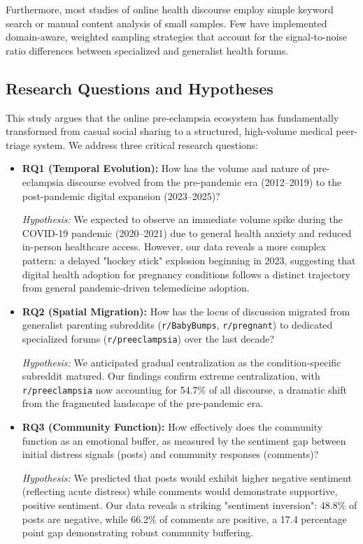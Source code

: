 \documentclass[12pt, a4paper]{article}
\begin{document}
Furthermore, most studies of online health discourse employ simple keyword search or manual content analysis of small samples. Few have implemented domain-aware, weighted sampling strategies that account for the signal-to-noise ratio differences between specialized and generalist health forums.

\subsection{Research Questions and Hypotheses}
This study argues that the online pre-eclampsia ecosystem has fundamentally transformed from casual social sharing to a structured, high-volume medical peer-triage system. We address three critical research questions:

\begin{itemize}
    \item \textbf{RQ1 (Temporal Evolution):} How has the volume and nature of pre-eclampsia discourse evolved from the pre-pandemic era (2012--2019) to the post-pandemic digital expansion (2023--2025)? 
    
    \textit{Hypothesis:} We expected to observe an immediate volume spike during the COVID-19 pandemic (2020--2021) due to general health anxiety and reduced in-person healthcare access. However, our data reveals a more complex pattern: a delayed "hockey stick" explosion beginning in 2023, suggesting that digital health adoption for pregnancy conditions follows a distinct trajectory from general pandemic-driven telemedicine adoption.
    
    \item \textbf{RQ2 (Spatial Migration):} How has the locus of discussion migrated from generalist parenting subreddits (\texttt{r/BabyBumps}, \texttt{r/pregnant}) to dedicated specialized forums (\texttt{r/preeclampsia}) over the last decade?
    
    \textit{Hypothesis:} We anticipated gradual centralization as the condition-specific subreddit matured. Our findings confirm extreme centralization, with \texttt{r/preeclampsia} now accounting for 54.7\% of all discourse, a dramatic shift from the fragmented landscape of the pre-pandemic era.
    
    \item \textbf{RQ3 (Community Function):} How effectively does the community function as an emotional buffer, as measured by the sentiment gap between initial distress signals (posts) and community responses (comments)?
    
    \textit{Hypothesis:} We predicted that posts would exhibit higher negative sentiment (reflecting acute distress) while comments would demonstrate supportive, positive sentiment. Our data reveals a striking "sentiment inversion": 48.8\% of posts are negative, while 66.2\% of comments are positive, a 17.4 percentage point gap demonstrating robust community buffering.
\end{itemize}
\end{document}
